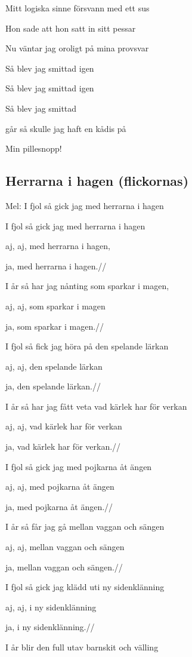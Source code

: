 Mitt logiska sinne försvann med ett sus

Hon sade att hon satt in sitt pessar

Nu väntar jag oroligt på mina provsvar\bigskip


Så blev jag smittad igen

Så blev jag smittad igen

Så blev jag smittad

går så skulle jag haft en kådis på

Min pillesnopp! 

\subsection{\textbf{Herrarna i hagen (flickornas)}} 

Mel: I fjol så gick jag med herrarna i hagen\bigskip


I fjol så gick jag med herrarna i hagen

aj, aj, med herrarna i hagen,

ja, med herrarna i hagen.//


I år så har jag nånting som sparkar i magen,

aj, aj, som sparkar i magen

ja, som sparkar i magen.//


I fjol så fick jag höra på den spelande lärkan

aj, aj, den spelande lärkan

ja, den spelande lärkan.//


I år så har jag fått veta vad kärlek har för verkan

aj, aj, vad kärlek har för verkan

ja, vad kärlek har för verkan.//


I fjol så gick jag med pojkarna åt ängen

aj, aj, med pojkarna åt ängen

ja, med pojkarna åt ängen.//


I år så får jag gå mellan vaggan och sängen

aj, aj, mellan vaggan och sängen

ja, mellan vaggan och sängen.//


I fjol så gick jag klädd uti ny sidenklänning

aj, aj, i ny sidenklänning

ja, i ny sidenklänning.//


I år blir den full utav barnskit och välling

